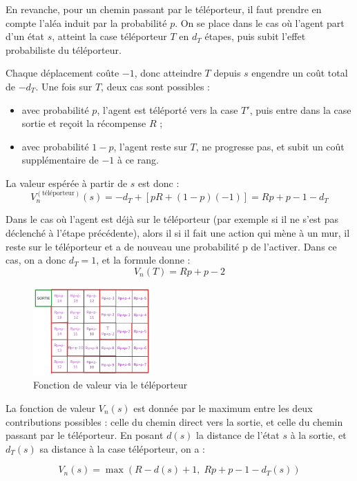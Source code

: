 \documentclass[12pt]{article}
\begin{document}
En revanche, pour un chemin passant par le téléporteur, il faut prendre en compte l’aléa induit par la probabilité \(p\). On se place dans le cas où l’agent part d’un état \(s\), atteint la case téléporteur \(T\) en \(d_T\) étapes, puis subit l’effet probabiliste du téléporteur.

Chaque déplacement coûte \(-1\), donc atteindre \(T\) depuis \(s\) engendre un coût total de \(-d_T\). Une fois sur \(T\), deux cas sont possibles :
\begin{itemize}
    \item avec probabilité \(p\), l’agent est téléporté vers la case \(T'\), puis entre dans la case sortie et reçoit la récompense \(R\) ;
    \item avec probabilité \(1 - p\), l’agent reste sur \(T\), ne progresse pas, et subit un coût supplémentaire de \(-1\) à ce rang.
\end{itemize} 

La valeur espérée à partir de \(s\) est donc :
\[
V_n^{(\text{téléporteur})}(s) = -d_T + \left[pR + (1 - p)(-1)\right] = Rp + p - 1 - d_T
\]

Dans le cas où l'agent est déjà sur le téléporteur (par exemple si il ne s'est pas déclenché à l'étape précédente), alors il si il fait une action qui mène à un mur, il reste sur le téléporteur et a de nouveau une probabilité p de l'activer. Dans ce cas, on a donc \(d_T = 1\), et la formule donne :
\[
V_n(T) = Rp + p - 2
\]

\begin{figure}[H]
    \centering
    \includegraphics[width=0.4\textwidth]{labyrinthesortie2.png}
    \caption{Fonction de valeur via le téléporteur}
\end{figure}

La fonction de valeur \(V_n(s)\) est donnée par le maximum entre les deux contributions possibles : celle du chemin direct vers la sortie, et celle du chemin passant par le téléporteur. En posant \(d(s)\) la distance de l’état \(s\) à la sortie, et \(d_T(s)\) sa distance à la case téléporteur, on a :

\[
V_n(s) = \max \left( R - d(s) + 1,\; Rp + p - 1 - d_T(s) \right)
\]
\end{document}
